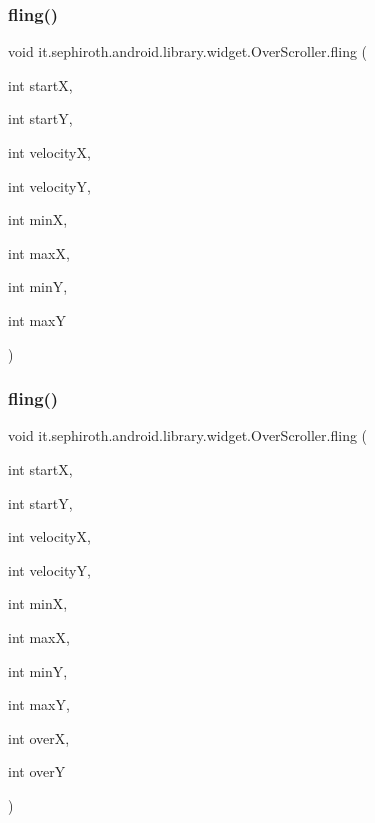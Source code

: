\subsubsection{\texorpdfstring{fling()}{fling()}\hspace{0.1cm}{\footnotesize\ttfamily [1/2]}}
{\footnotesize\ttfamily void it.\+sephiroth.\+android.\+library.\+widget.\+Over\+Scroller.\+fling (\begin{DoxyParamCaption}\item[{int}]{startX,  }\item[{int}]{startY,  }\item[{int}]{velocityX,  }\item[{int}]{velocityY,  }\item[{int}]{minX,  }\item[{int}]{maxX,  }\item[{int}]{minY,  }\item[{int}]{maxY }\end{DoxyParamCaption})}

\mbox{\label{classit_1_1sephiroth_1_1android_1_1library_1_1widget_1_1_over_scroller_ad9fb62c5f9c44a97e096cdfc6240825a}} 
\subsubsection{\texorpdfstring{fling()}{fling()}\hspace{0.1cm}{\footnotesize\ttfamily [2/2]}}
{\footnotesize\ttfamily void it.\+sephiroth.\+android.\+library.\+widget.\+Over\+Scroller.\+fling (\begin{DoxyParamCaption}\item[{int}]{startX,  }\item[{int}]{startY,  }\item[{int}]{velocityX,  }\item[{int}]{velocityY,  }\item[{int}]{minX,  }\item[{int}]{maxX,  }\item[{int}]{minY,  }\item[{int}]{maxY,  }\item[{int}]{overX,  }\item[{int}]{overY }\end{DoxyParamCaption})}

